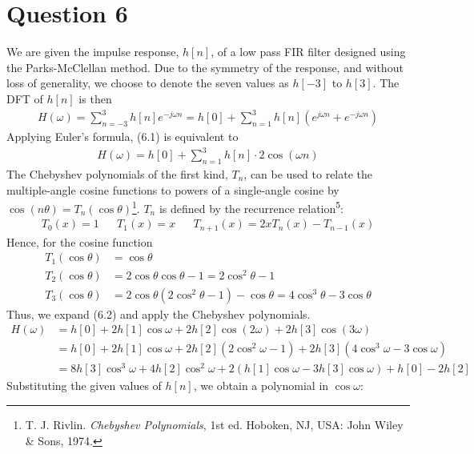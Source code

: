 \section*{Question 6}

We are given the impulse response, $h[n]$, of a low pass FIR filter designed using the Parks-McClellan method. Due to the symmetry of the response, and without loss of generality, we choose to denote the seven values as $h[-3]$ to $h[3]$. The DFT of $h[n]$ is then
\begin{align}
    H(\omega) = \sum_{n=-3}^{3} h[n] e^{-j\omega n}
              = h[0] + \sum_{n=1}^{3} h[n] \left( e^{j\omega n} + e^{-j\omega n} \right)
\end{align}
Applying Euler's formula, (6.1) is equivalent to
\begin{align}
    H(\omega) = h[0] + \sum_{n=1}^{3} h[n] \cdot 2 \cos(\omega n)
\end{align}
The Chebyshev polynomials of the first kind, $T_n$, can be used to relate the multiple-angle cosine functions to powers of a single-angle cosine by $\cos(n\theta)=T_n(\cos\theta)$\footnote{T. J. Rivlin. \textit{Chebyshev Polynomials}, 1st ed. Hoboken, NJ, USA: John Wiley \& Sons, 1974.}. $T_n$ is defined by the recurrence relation\textsuperscript{5}:
\begin{align*}
    T_0(x)     = 1 &&
    T_1(x)     = x &&
    T_{n+1}(x) = 2xT_n(x) - T_{n-1}(x)
\end{align*}
Hence, for the cosine function
\begin{align*}
    T_1(\cos\theta) &= \cos\theta \\
    T_2(\cos\theta) &= 2\cos\theta\cos\theta - 1 = 2\cos^2\theta - 1 \\
    T_3(\cos\theta) &= 2\cos\theta\left( 2\cos^2\theta - 1 \right) - \cos\theta = 4\cos^3\theta - 3\cos\theta
\end{align*}
Thus, we expand (6.2) and apply the Chebyshev polynomials.
\begin{align*}
    H(\omega) &= h[0] + 2 h[1]\cos\omega + 2 h[2]\cos(2\omega) + 2 h[3]\cos(3\omega) \\
              &= h[0] + 2 h[1]\cos\omega + 2 h[2]\left( 2\cos^2\omega - 1 \right) + 2 h[3]\left( 4\cos^3\omega - 3\cos\omega \right) \\
              &= 8 h[3]\cos^3\omega + 4 h[2]\cos^2\omega + 2\left( h[1]\cos\omega - 3h[3]\cos\omega \right) + h[0] - 2 h[2]
\end{align*}
Substituting the given values of $h[n]$, we obtain a polynomial in $\cos\omega$:
